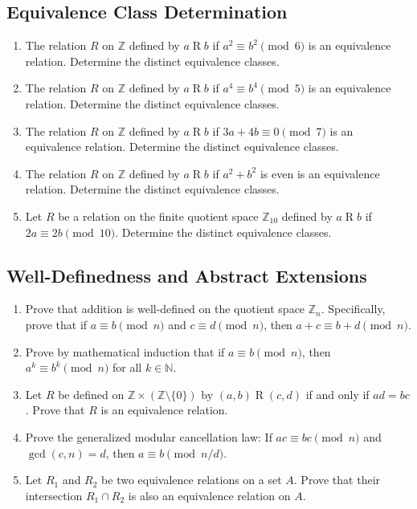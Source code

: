 \documentclass[11pt, a4paper]{article}
\theoremstyle{definition}
\theoremstyle{remark}
\newcommand{\N}{\mathbb{N}}
\newcommand{\Z}{\mathbb{Z}}
\begin{document}
\subsection{Equivalence Class Determination}
\begin{enumerate}[label=\textbf{\arabic*.}, resume]
    \item The relation $R$ on $\Z$ defined by $a \mathrel{R} b$ if $a^2 \equiv b^2 \pmod{6}$ is an equivalence relation. Determine the distinct equivalence classes.
    \item The relation $R$ on $\Z$ defined by $a \mathrel{R} b$ if $a^4 \equiv b^4 \pmod{5}$ is an equivalence relation. Determine the distinct equivalence classes.
    \item The relation $R$ on $\Z$ defined by $a \mathrel{R} b$ if $3a + 4b \equiv 0 \pmod{7}$ is an equivalence relation. Determine the distinct equivalence classes.
    \item The relation $R$ on $\Z$ defined by $a \mathrel{R} b$ if $a^2 + b^2$ is even is an equivalence relation. Determine the distinct equivalence classes.
    \item Let $R$ be a relation on the finite quotient space $\Z_{10}$ defined by $a \mathrel{R} b$ if $2a \equiv 2b \pmod{10}$. Determine the distinct equivalence classes.
\end{enumerate}

\subsection{Well-Definedness and Abstract Extensions}
\begin{enumerate}[label=\textbf{\arabic*.}, resume]
    \item Prove that addition is well-defined on the quotient space $\Z_n$. Specifically, prove that if $a \equiv b \pmod{n}$ and $c \equiv d \pmod{n}$, then $a+c \equiv b+d \pmod{n}$.
    \item Prove by mathematical induction that if $a \equiv b \pmod{n}$, then $a^k \equiv b^k \pmod{n}$ for all $k \in \N$.
    \item Let $R$ be defined on $\Z \times (\Z \setminus \{0\})$ by $(a,b) \mathrel{R} (c,d)$ if and only if $ad = bc$. Prove that $R$ is an equivalence relation.
    \item Prove the generalized modular cancellation law: If $ac \equiv bc \pmod{n}$ and $\gcd(c,n) = d$, then $a \equiv b \pmod{n/d}$.
    \item Let $R_1$ and $R_2$ be two equivalence relations on a set $A$. Prove that their intersection $R_1 \cap R_2$ is also an equivalence relation on $A$.
\end{enumerate}
\end{document}
